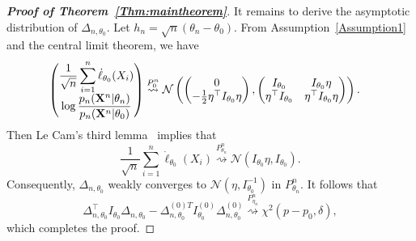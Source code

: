 \documentclass[11pt]{article}
\theoremstyle{plain}
\theoremstyle{definition}
\theoremstyle{remark}
\begin{document}
\begin{proof}[\textbf{Proof of Theorem~\ref{Thm:maintheorem}}]
It remains to derive the asymptotic distribution of $\Delta_{n,\theta_0}$.
Let $h_n=\sqrt{n}(\theta_n-\theta_0)$.
     From Assumption~\ref{Assumption1} and the central limit theorem, we have
\begin{equation*}
    \begin{split}
    \left(
    \begin{matrix}
        \displaystyle
        \frac{1}{\sqrt{n}}\sum^n_{i=1}\dot{\ell}_{\theta_0}(X_i)
        \\
        \displaystyle
        \log \frac{p_n(\mathbf{X}^{n}|\theta_n)}{p_n(\mathbf{X}^{n}|\theta_0)}
    \end{matrix}
    \right)
    &\overset{P_0^n}{\rightsquigarrow}
    \mathcal{N}\left(
    \left(
    \begin{matrix}
        0\\
        -\frac{1}{2}\eta^\top  I_{\theta_0}\eta
    \end{matrix}
    \right),
    \left(
        \begin{matrix}
            I_{\theta_0}&I_{\theta_0}\eta\\
            \eta^\top  I_{\theta_0}&\eta^\top  I_{\theta_0}\eta
        \end{matrix}
    \right)
    \right).
    \end{split}
\end{equation*}
Then Le Cam's third lemma~\citep[Example 6.7]{van2000asymptotic} implies that
\begin{equation*}
    \frac{1}{\sqrt{n}}\sum^n_{i=1}\dot{\ell}_{\theta_0}(X_i)\overset{P^n_{\theta_n}}{\rightsquigarrow} \mathcal{N}(I_{\theta_0}\eta,I_{\theta_0}).
\end{equation*}
Consequently,
$
\Delta_{n,\theta_0}
$
weakly converges to $\mathcal{N}(\eta, I_{\theta_0}^{-1})$ in  $P^n_{\theta_n}$.
It follows that
\begin{equation*}
\Delta_{n,\theta_0}^\top  I_{\theta_0} \Delta_{n,\theta_0}
-
\Delta_{n,\theta_0}^{{(0)}T} I^{(0)}_{\theta_0} \Delta^{(0)}_{n,\theta_0}
\overset{P_{\eta_n}^n}{\rightsquigarrow} \chi^2(p-p_0,\delta),
\end{equation*}
which completes the proof.

    \end{proof}
\end{document}
